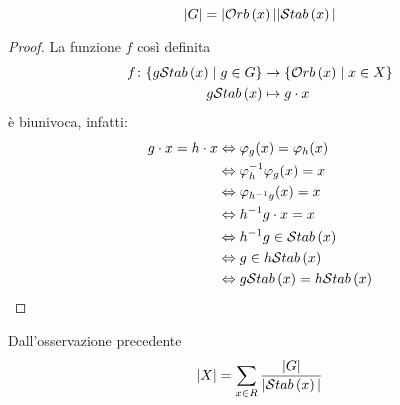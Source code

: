 \begin{multicols}{2}
\begin{prop}
	\[ |G| = |\mathcal{O}rb\left( x \right)||\mathcal{S}tab\left( x \right)| \]
\end{prop}
\begin{proof}
	La funzione $ f $ così definita
	\begin{align*}
	f \colon \{ g \mathcal{S}tab\left( x \right) \mid g \in G \} &\to \{\mathcal{O}rb\left( x \right) \mid x \in X\} \\
	g\mathcal{S}tab\left( x \right) &\mapsto g \cdot x
	\end{align*}
	è biunivoca, infatti:
	\begin{align*}
		g \cdot x = h \cdot x & \Leftrightarrow \varphi_g(x) = \varphi_h(x) \\
		& \Leftrightarrow \varphi_h^{-1} \varphi_g (x) = x \\
		& \Leftrightarrow \varphi_{h^{-1}g} (x) = x \\
		& \Leftrightarrow h^{-1}g \cdot x = x \\
		& \Leftrightarrow h^{-1}g \in \mathcal{S}tab\left( x \right) \\
		& \Leftrightarrow g \in h\mathcal{S}tab\left( x \right) \\
		& \Leftrightarrow g\mathcal{S}tab\left( x \right) = h\mathcal{S}tab\left( x \right) \\
	\end{align*}
\end{proof}
\begin{remark}
	Dall'osservazione precedente \[ |X| = \sum_{x \in R} \frac{|G|}{|\mathcal{S}tab\left( x \right)|} \]
\end{remark}


\end{multicols}
